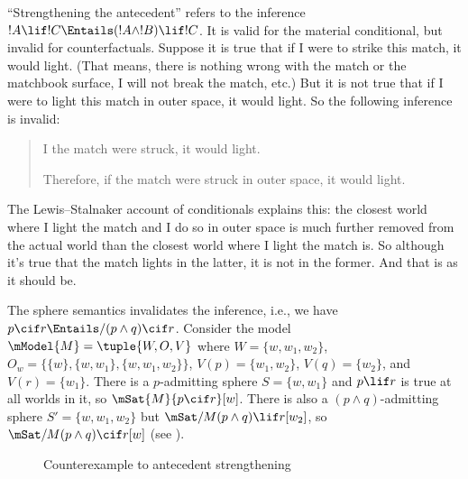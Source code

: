 \documentclass[../../../include/open-logic-section]{subfiles}
\begin{document}

``Strengthening the antecedent'' refers to the
inference $!A \lif !C \Entails (!A \land !B) \lif !C$.  It is valid
for the material conditional, but invalid for counterfactuals. Suppose
it is true that if I were to strike this match, it would light. (That
means, there is nothing wrong with the match or the matchbook surface,
I will not break the match, etc.) But it is not true that if I were to
light this match in outer space, it would light. So the following
inference is invalid:
\begin{quote}
  I the match were struck, it would light.

  Therefore, if the match were struck in outer space, it would light.
\end{quote}

The Lewis--Stalnaker account of conditionals explains this: the closest
world where I light the match and I do so in outer space is much
further removed from the actual world than the closest world where I
light the match is. So although it's true that the match lights in the
latter, it is not in the former. And that is as it should be.

\begin{ex}
  The sphere semantics invalidates the inference, i.e., we have $p
  \cif r \Entails/ (p \land q) \cif r$. Consider the model $\mModel{M}
  = \tuple{W, O, V}$ where $W = \{w, w_1, w_2\}$, $O_w = \{\{w\}, \{w,
  w_1\}, \{w, w_1, w_2\}\}$, $V(p) = \{w_1, w_2\}$, $V(q) = \{w_2\}$,
  and $V(r) = \{w_1\}$. There is a $p$-admitting sphere $S = \{w,
  w_1\}$ and $p \lif r$ is true at all worlds in it, so $\mSat{M}{p
    \cif r}[w]$. There is also a $(p \land q)$-admitting sphere $S' =
  \{w, w_1, w_2\}$ but $\mSat/{M}{(p \land q) \lif r}[w_2]$, so
  $\mSat/{M}{(p \land q) \cif r}[w]$ (see ).

\begin{figure}
\centering
{}
\caption{Counterexample to antecedent strengthening}
\end{figure}
\end{ex}
\end{document}
